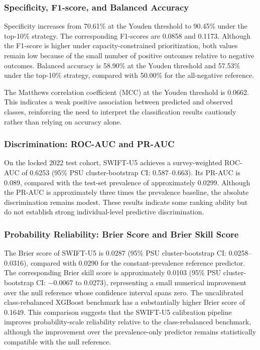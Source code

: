\documentclass[a4paper,fleqn]{cas-sc}
\begin{document}
\subsubsection{Specificity, F1-score, and Balanced Accuracy}

Specificity increases from 70.61\% at the Youden threshold to 90.45\% under the top-10\% strategy. The corresponding F1-scores are 0.0858 and 0.1173. Although the F1-score is higher under capacity-constrained prioritization, both values remain low because of the small number of positive outcomes relative to negative outcomes. Balanced accuracy is 58.90\% at the Youden threshold and 57.53\% under the top-10\% strategy, compared with 50.00\% for the all-negative reference.

The Matthews correlation coefficient (MCC) at the Youden threshold is 0.0662. This indicates a weak positive association between predicted and observed classes, reinforcing the need to interpret the classification results cautiously rather than relying on accuracy alone.

\subsubsection{Discrimination: ROC-AUC and PR-AUC}

On the locked 2022 test cohort, SWIFT-U5 achieves a survey-weighted ROC-AUC of 0.6253 (95\% PSU cluster-bootstrap CI: 0.587--0.663). Its PR-AUC is 0.089, compared with the test-set prevalence of approximately 0.0299. Although the PR-AUC is approximately three times the prevalence baseline, the absolute discrimination remains modest. These results indicate some ranking ability but do not establish strong individual-level predictive discrimination.

\subsubsection{Probability Reliability: Brier Score and Brier Skill Score}

The Brier score of SWIFT-U5 is 0.0287 (95\% PSU cluster-bootstrap CI: 0.0258--0.0316), compared with 0.0290 for the constant-prevalence reference predictor. The corresponding Brier skill score is approximately 0.0103 (95\% PSU cluster-bootstrap CI: $-$0.0067 to 0.0273), representing a small numerical improvement over the null reference whose confidence interval spans zero. The uncalibrated class-rebalanced XGBoost benchmark has a substantially higher Brier score of 0.1649. This comparison suggests that the SWIFT-U5 calibration pipeline improves probability-scale reliability relative to the class-rebalanced benchmark, although the improvement over the prevalence-only predictor remains statistically compatible with the null reference.
\end{document}

